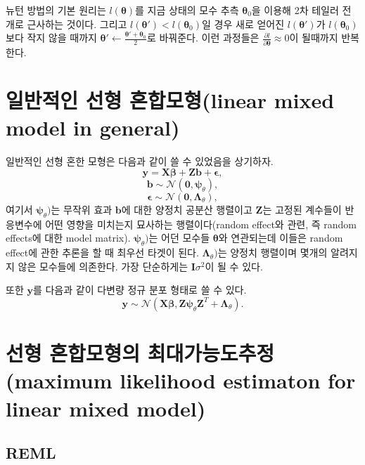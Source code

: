 \documentclass[b5paper,]{scrbook}
\theoremstyle{plain}
\theoremstyle{definition}
\numberwithin{equation}{section}
\begin{document}
뉴턴 방법의 기본 원리는 \(l(\boldsymbol{\theta})\)를 지금 상태의 모수 추측 \(\boldsymbol{\theta}_{0}\)을 이용해 2차 테일러 전개로 근사하는 것이다. 그리고 \(l(\boldsymbol{\theta}')<l(\boldsymbol{\theta}_{0})\)일 경우 새로 얻어진 \(l(\boldsymbol{\theta}')\)가 \(l(\boldsymbol{\theta}_{0})\)보다 작지 않을 때까지 \(\boldsymbol{\theta}' \leftarrow \frac{\boldsymbol{\theta}' + \boldsymbol{\theta}_{0}}{2}\)로 바꿔준다. 이런 과정들은 \(\frac{\partial l}{\partial \boldsymbol{\theta}}\approx 0\)이 될때까지 반복한다.

\hypertarget{--linear-mixed-model-in-general}{%
\section{일반적인 선형 혼합모형(linear mixed model in general)}\label{--linear-mixed-model-in-general}}

일반적인 선형 혼한 모형은 다음과 같이 쓸 수 있었음을 상기하자.
\[\mathbf{y}=\mathbf{X}\boldsymbol{\beta}+\mathbf{Zb}+\boldsymbol{\epsilon},\]
\[\mathbf{b}\sim\mathcal{N}(\mathbf{0},\boldsymbol{\psi}_{\theta}),\]
\[\boldsymbol{\epsilon}\sim\mathcal{N}(\mathbf{0},\boldsymbol{\Lambda}_{\theta}),\]
여기서 \(\boldsymbol{\psi}_{\theta})\)는 무작위 효과 \(\mathbf{b}\)에 대한 양정치 공분산 행렬이고 \(\mathbf{Z}\)는 고정된 계수들이 반응변수에 어떤 영향을 미치는지 묘사하는 행렬이다(random effect와 관련, 즉 random effects에 대한 model matrix). \(\boldsymbol{\psi}_{\theta})\)는 어던 모수들 \(\boldsymbol{\theta}\)와 연관되는데 이들은 random effect에 관한 추론을 할 때 최우선 타겟이 된다. \(\boldsymbol{\Lambda}_{\theta})\)는 양정치 행렬이며 몇개의 알려지지 않은 모수들에 의존한다. 가장 단순하게는 \(\mathbf{I}\sigma^{2}\)이 될 수 있다.

또한 \(\mathbf{y}\)를 다음과 같이 다변량 정규 분포 형태로 쓸 수 있다.
\[\mathbf{y} \sim \mathcal{N}(\mathbf{X}\boldsymbol{\beta}, \mathbf{Z}\boldsymbol{\psi}_{\theta}\mathbf{Z}^{T}+\boldsymbol{\Lambda}_{\theta}).\]

\hypertarget{--maximum-likelihood-estimaton-for-linear-mixed-model}{%
\section{선형 혼합모형의 최대가능도추정(maximum likelihood estimaton for linear mixed model)}\label{--maximum-likelihood-estimaton-for-linear-mixed-model}}

\hypertarget{reml}{%
\subsection{REML}\label{reml}}
\end{document}
